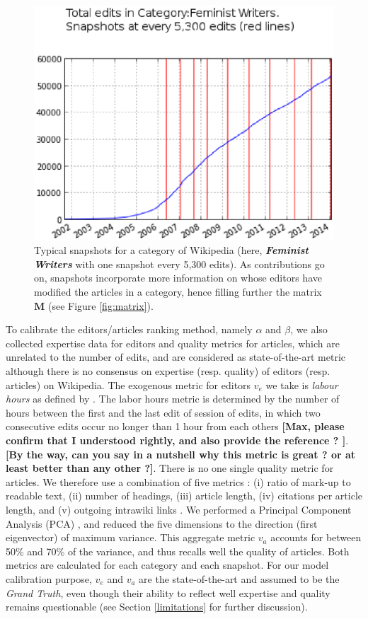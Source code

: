 \begin{figure}[!t]
\centering
\includegraphics[width=0.9\columnwidth]{Figures/cumulative_snapshots_Feminist_Writers.eps}
\caption{Typical snapshots for a category of Wikipedia (here, \textit{\textbf{Feminist Writers}} with one snapshot every 5,300 edits). As contributions go on, snapshots incorporate more information on whose editors have modified the articles in a category, hence filling further the matrix $\mathbf{M}$ (see Figure \ref{fig:matrix}).}
\label{fig:figure1}
\end{figure}

To calibrate the editors/articles ranking method, namely $\alpha$ and $\beta$, we also collected expertise data for editors and quality metrics for articles, which are unrelated to the number of edits, and are considered as state-of-the-art metric although there is no consensus on expertise (resp. quality) of editors (resp. articles) on Wikipedia. The exogenous metric for editors $v_e$ we take is {\it labour hours} as defined by  \cite{halfaker/geiger}. The labor hours metric is determined by the number of hours between the first and the last edit of session of edits, in which two consecutive edits occur no longer than 1 hour from each others {\bf [Max, please confirm that I understood rightly, and also provide the reference ? ]}. {\bf [By the way, can you say in a nutshell why this metric is great ? or at least better than any other ?]}. There is no one single quality metric for articles. We therefore use a combination of five metrics : (i) ratio of mark-up to readable text, (ii) number of headings, (iii) article length, (iv) citations per article length, and (v) outgoing intrawiki links \cite{wang2013tell,klein2014investigating}. We performed a Principal Component Analysis (PCA) , and reduced the five dimensions to the direction (first eigenvector) of
 maximum variance. This aggregate metric $v_a$ accounts for between 50\% and 70\% of the variance, and thus recalls well the quality of articles. Both metrics are calculated for each category and each snapshot. For our model calibration purpose, $v_e$ and $v_a$ are the state-of-the-art and assumed to be the {\it Grand Truth}, even though their ability to reflect well expertise and quality remains questionable (see Section \ref{limitations} for further discussion).
